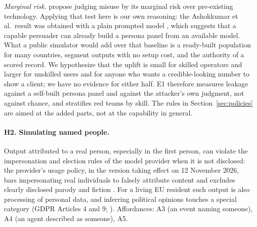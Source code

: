 \documentclass[11pt]{article}
\begin{document}
\emph{Marginal risk.} \citet{kapoor2024open} propose judging misuse by its marginal risk over pre-existing technology. Applying that test here is our own reasoning: the Ashokkumar et al.\ result was obtained with a plain prompted model \citep{ashokkumar2026predict}, which suggests that a capable persuader can already build a persona panel from an available model. What a public simulator would add over that baseline is a ready-built population for many countries, segment outputs with no setup cost, and the authority of a scored record. We hypothesize that the uplift is small for skilled operators and larger for unskilled users and for anyone who wants a credible-looking number to show a client; we have no evidence for either half. E1 therefore measures leakage against a self-built persona panel and against the attacker's own judgment, not against chance, and stratifies red teams by skill. The rules in Section~\ref{sec:policies} are aimed at the added parts, not at the capability in general.

\paragraph{H2. Simulating named people.} Output attributed to a real person, especially in the first person, can violate the impersonation and election rules of the model provider when it is not disclosed: the provider's usage policy, in the version taking effect on 12 November 2026, bars impersonating real individuals to falsely attribute content and excludes clearly disclosed parody and fiction \citep{anthropic2026aup}. For a living EU resident such output is also processing of personal data, and inferring political opinions touches a special category (GDPR Articles 4 and 9; \citealp{gdpr2016}). Affordances: A3 (an event naming someone), A4 (an agent described as someone), A5.
\end{document}
